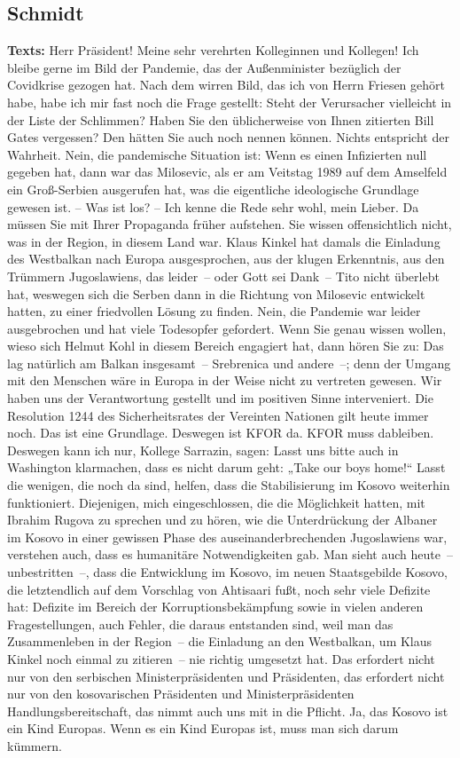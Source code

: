 \documentclass{article}
\begin{document}
\subsection{Schmidt}
\noindent\textbf{Texts:} Herr Präsident! Meine sehr verehrten Kolleginnen und Kollegen! Ich bleibe gerne im Bild der Pandemie, das der Außenminister bezüglich der Covidkrise gezogen hat. Nach dem wirren Bild, das ich von Herrn Friesen gehört habe, habe ich mir fast noch die Frage gestellt: Steht der Verursacher vielleicht in der Liste der Schlimmen? Haben Sie den üblicherweise von Ihnen zitierten Bill Gates vergessen? Den hätten Sie auch noch nennen können. Nichts entspricht der Wahrheit. Nein, die pandemische Situation ist: Wenn es einen Infizierten null gegeben hat, dann war das Milosevic, als er am Veitstag 1989 auf dem Amselfeld ein Groß-Serbien ausgerufen hat, was die eigentliche ideologische Grundlage gewesen ist.  – Was ist los?  – Ich kenne die Rede sehr wohl, mein Lieber. Da müssen Sie mit Ihrer Propaganda früher aufstehen. Sie wissen offensichtlich nicht, was in der Region, in diesem Land war.  Klaus Kinkel hat damals die Einladung des Westbalkan nach Europa ausgesprochen, aus der klugen Erkenntnis, aus den Trümmern Jugoslawiens, das leider – oder Gott sei Dank – Tito nicht überlebt hat, weswegen sich die Serben dann in die Richtung von Milosevic entwickelt hatten, zu einer friedvollen Lösung zu finden. Nein, die Pandemie war leider ausgebrochen und hat viele Todesopfer gefordert. Wenn Sie genau wissen wollen, wieso sich Helmut Kohl in diesem Bereich engagiert hat, dann hören Sie zu: Das lag natürlich am Balkan insgesamt – Srebrenica und andere –; denn der Umgang mit den Menschen wäre in Europa in der Weise nicht zu vertreten gewesen. Wir haben uns der Verantwortung gestellt und im positiven Sinne interveniert.  Die Resolution 1244 des Sicherheitsrates der Vereinten Nationen gilt heute immer noch.  Das ist eine Grundlage. Deswegen ist KFOR da. KFOR muss dableiben. Deswegen kann ich nur, Kollege Sarrazin, sagen: Lasst uns bitte auch in Washington klarmachen, dass es nicht darum geht: „Take our boys home!“ Lasst die wenigen, die noch da sind, helfen, dass die Stabilisierung im Kosovo weiterhin funktioniert.  Diejenigen, mich eingeschlossen, die die Möglichkeit hatten, mit Ibrahim Rugova zu sprechen und zu hören, wie die Unterdrückung der Albaner im Kosovo in einer gewissen Phase des auseinanderbrechenden Jugoslawiens war, verstehen auch, dass es humanitäre Notwendigkeiten gab. Man sieht auch heute – unbestritten –, dass die Entwicklung im Kosovo, im neuen Staatsgebilde Kosovo, die letztendlich auf dem Vorschlag von Ahtisaari fußt, noch sehr viele Defizite hat: Defizite im Bereich der Korruptionsbekämpfung sowie in vielen anderen Fragestellungen, auch Fehler, die daraus entstanden sind, weil man das Zusammenleben in der Region – die Einladung an den Westbalkan, um Klaus Kinkel noch einmal zu zitieren – nie richtig umgesetzt hat. Das erfordert nicht nur von den serbischen Ministerpräsidenten und Präsidenten, das erfordert nicht nur von den kosovarischen Präsidenten und Ministerpräsidenten Handlungsbereitschaft, das nimmt auch uns mit in die Pflicht. Ja, das Kosovo ist ein Kind Europas. Wenn es ein Kind Europas ist, muss man sich darum kümmern. 
\end{document}
